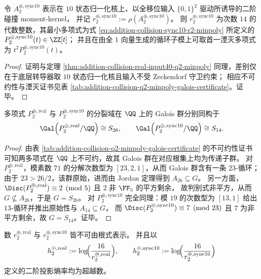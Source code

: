 \begin{theorem}\label{thm:addition-collision-sync10-q2-minpoly}
令 \(A^{\oplus,\mathrm{sync10}}_2\) 表示在 \(10\) 状态归一化核上、以全移位输入 \(\{0,1\}^2\) 驱动所诱导的二阶碰撞 moment-kernel，
并记 \(r^{\oplus,\mathrm{sync10}}_2:=\rho(A^{\oplus,\mathrm{sync10}}_2)\)。
则 \(r^{\oplus,\mathrm{sync10}}_2\) 为次数 \(14\) 的代数整数，其最小多项式为式 \ref{eq:addition-collision-sync10-r2-minpoly} 所定义的
\(P^{\oplus,\mathrm{sync10}}_2(t)\in\ZZ[t]\)；
并且在由全 \(1\) 向量生成的循环子模上可取首一湮灭多项式为 \(t^{2}P^{\oplus,\mathrm{sync10}}_2(t)\)。
\end{theorem}

\begin{proof}
证明与定理 \ref{thm:addition-collision-real-input40-q2-minpoly} 同理，差别仅在于底层转导器取 \(10\) 状态归一化核且输入不受 Zeckendorf 守卫约束；
相应不可约性与湮灭证书见表 \ref{tab:addition-collision-q2-minpoly-galois-certificate}。证毕。
\end{proof}

\begin{theorem}\label{thm:addition-collision-q2-full-symmetric-galois}
多项式 \(P^{\oplus,\mathrm{real}}_2\) 与 \(P^{\oplus,\mathrm{sync10}}_2\) 的分裂域在 \(\QQ\) 上的 Galois 群分别同构于
\[
\Gal\!\left(P^{\oplus,\mathrm{real}}_2/\QQ\right)\cong S_{26},
\qquad
\Gal\!\left(P^{\oplus,\mathrm{sync10}}_2/\QQ\right)\cong S_{14}.
\]
\end{theorem}

\begin{proof}
由表 \ref{tab:addition-collision-q2-minpoly-galois-certificate} 的不可约性证书可知两多项式在 \(\QQ\) 上不可约，故其 Galois 群在对应根集上均为传递子群。
对 \(P^{\oplus,\mathrm{real}}_2\)，模素数 \(71\) 的分解次数型为 \([23,2,1]\)，从而 Galois 群含有一条 \(23\)-循环；
由于 \(23>26/2\)，该群原始，进而由 Jordan 定理得到 \(A_{26}\subseteq G\)。
另一方面，\(\Disc(P^{\oplus,\mathrm{real}}_2)\equiv 2\pmod{5}\) 且 \(2\) 非 \(\FF_{5}\) 的平方剩余，
故判别式非平方，从而 \(G\nsubseteq A_{26}\)，于是 \(G=S_{26}\)。
对 \(P^{\oplus,\mathrm{sync10}}_2\) 完全同理：模 \(19\) 的次数型为 \([13,1]\) 给出 \(13\)-循环并推出原始性与 \(A_{14}\subseteq G\)，
而 \(\Disc(P^{\oplus,\mathrm{sync10}}_2)\equiv 7\pmod{23}\) 且 \(7\) 为非平方剩余，故 \(G=S_{14}\)。证毕。
\end{proof}

\begin{corollary}[不可根式化与二阶投影熵率的超越性]\label{cor:addition-collision-q2-nonradical-transcendental}
数 \(r^{\oplus,\mathrm{real}}_2\) 与 \(r^{\oplus,\mathrm{sync10}}_2\) 皆不可由根式表示。
并且以
\[
h^{\oplus,\mathrm{real}}_2:=\log\!\Bigl(\frac{16}{r^{\oplus,\mathrm{real}}_2}\Bigr),
\qquad
h^{\oplus,\mathrm{sync10}}_2:=\log\!\Bigl(\frac{16}{r^{\oplus,\mathrm{sync10}}_2}\Bigr)
\]
定义的二阶投影熵率均为超越数。
\end{corollary}

